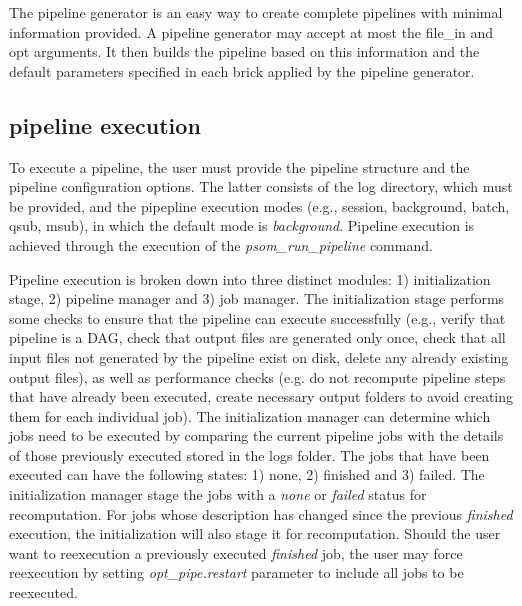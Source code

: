 \documentclass{report}
\begin{document}
        The pipeline generator is an easy way to create complete pipelines with
        minimal information provided. A pipeline generator may accept at most
        the file\_in and opt arguments. It then builds the pipeline based on
        this information and the default parameters specified in each brick
        applied by the pipeline generator.

        \subsection{pipeline execution}
        
        To execute a pipeline, the user must provide the pipeline structure and
        the pipeline configuration options. The latter consists of the log
        directory, which must be provided, and the pipepline execution modes
        (e.g., session, background, batch, qsub, msub), in which the default
        mode is \textit{background}. Pipeline execution is achieved through the
        execution of the \textit{psom\_run\_pipeline} command. 

        Pipeline execution is broken down into three distinct modules: 1)
        initialization stage, 2) pipeline manager and 3) job manager. The
        initialization stage performs some checks to ensure that the pipeline
        can execute successfully (e.g., verify that pipeline is a DAG, check
        that output files are generated only once, check that all input files
        not generated by the pipeline exist on disk, delete any already existing
        output files), as well as performance checks (e.g.  do not recompute
        pipeline steps that have already been executed, create necessary output
        folders to avoid creating them for each individual job). The
        initialization manager can determine which jobs need to be executed by
        comparing the current pipeline jobs with the details of those previously
        executed stored in the logs folder. The jobs that have been executed can
        have the following states: 1) none, 2) finished and 3) failed. The
        initialization manager stage the jobs with a \textit{none} or
        \textit{failed} status for recomputation. For jobs whose description has
        changed since the previous \textit{finished} execution, the
        initialization will also stage it for recomputation. Should the user
        want to reexecution a previously executed \textit{finished} job, the
        user may force reexecution by setting \textit{opt\_pipe.restart}
        parameter to include all jobs to be reexecuted.
\end{document}
